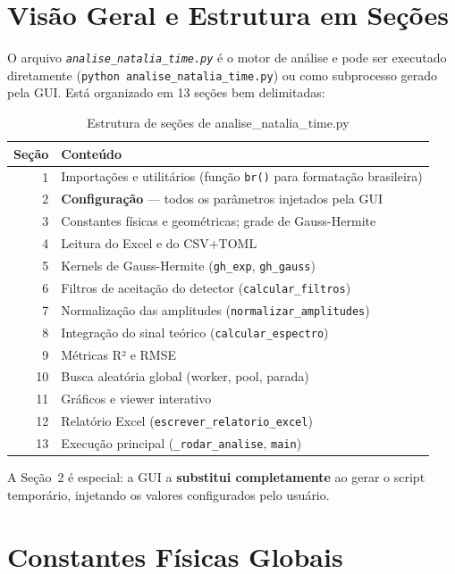 \documentclass[12pt,a4paper]{report}
\newcommand{\code}[1]{\texttt{#1}}
\newcommand{\arquivo}[1]{\texttt{\itshape #1}}
\begin{document}
\section{Visão Geral e Estrutura em Seções}

O arquivo \arquivo{analise\_natalia\_time.py} é o motor de análise e pode
ser executado diretamente (\code{python analise\_natalia\_time.py}) ou
como subprocesso gerado pela GUI. Está organizado em 13 seções bem delimitadas:

\begin{table}[h!]
  \centering
  \caption{Estrutura de seções de analise\_natalia\_time.py}
  \begin{tabular}{rp{11cm}}
    \toprule
    \textbf{Seção} & \textbf{Conteúdo} \\
    \midrule
    1  & Importações e utilitários (função \code{br()} para formatação brasileira) \\
    2  & \textbf{Configuração} — todos os parâmetros injetados pela GUI \\
    3  & Constantes físicas e geométricas; grade de Gauss-Hermite \\
    4  & Leitura do Excel e do CSV+TOML \\
    5  & Kernels de Gauss-Hermite (\code{gh\_exp}, \code{gh\_gauss}) \\
    6  & Filtros de aceitação do detector (\code{calcular\_filtros}) \\
    7  & Normalização das amplitudes (\code{normalizar\_amplitudes}) \\
    8  & Integração do sinal teórico (\code{calcular\_espectro}) \\
    9  & Métricas R² e RMSE \\
    10 & Busca aleatória global (worker, pool, parada) \\
    11 & Gráficos e viewer interativo \\
    12 & Relatório Excel (\code{escrever\_relatorio\_excel}) \\
    13 & Execução principal (\code{\_rodar\_analise}, \code{main}) \\
    \bottomrule
  \end{tabular}
\end{table}

A Seção~2 é especial: a GUI a \textbf{substitui completamente} ao gerar o
script temporário, injetando os valores configurados pelo usuário.

\section{Constantes Físicas Globais}
\end{document}
